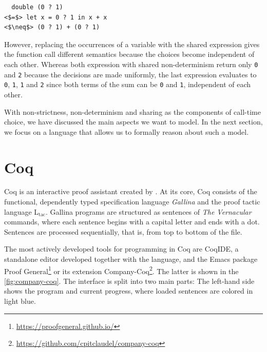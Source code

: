 \documentclass[a4paper, 11pt, fleqn, twoside]{scrreprt}
\newcommand{\hinl}[1]{\texttt{#1}}
\newcommand{\cinl}[1]{\texttt{#1}}
\begin{document}
\begin{verbatim}
  double (0 ? 1) 
<$=$> let x = 0 ? 1 in x + x 
<$\neq$> (0 ? 1) + (0 ? 1)
\end{verbatim}

However, replacing the occurrences of a variable with the shared expression gives the function call different semantics because the choices become independent of each other.
Whereas both expression with shared non-determinism return only \hinl{0} and \hinl{2} because the decisions are made uniformly, the last expression evaluates to \hinl{0}, \hinl{1}, \hinl{1} and \cinl{2} since both terms of the sum can be \hinl{0} and \cinl{1}, independent of each other.

With non-strictness, non-determinism and sharing as the  components of call-time choice, we have discussed the main aspects we want to model.
In the next section, we focus on a language that allows us to formally reason about such a model.

\section{Coq}
\label{sec:coqIntro}

Coq is an interactive proof assistant created by \citet{coq2019}.
At its core, Coq consists of the functional, dependently typed specification language \textit{Gallina} and the proof tactic language L$_\text{tac}$.
Gallina programs are structured as sentences of \textit{The Vernacular} commands, where each sentence begins with a capital letter and ends with a dot.
Sentences are processed sequentially, that is, from top to bottom of the file.

The most actively developed tools for programming in Coq are CoqIDE, a standalone editor developed together with the language, and the Emacs package Proof General\footnote{\url{https://proofgeneral.github.io/}} or its extension Company-Coq\footnote{\url{https://github.com/cpitclaudel/company-coq}}.
The latter is shown in the \autoref{fig:company-coq}.
The interface is split into two main parts: The left-hand side shows the program and current progress, where loaded sentences are colored in light blue.
\end{document}
